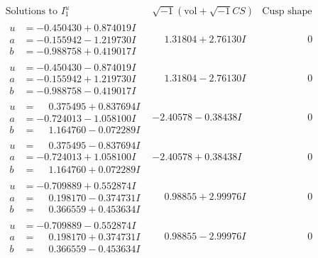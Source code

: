 \documentclass[1p]{elsarticle_modified}
\theoremstyle{definition}
\newcommand{\I}{\sqrt{-1}}
\begin{document}
$$\begin{array}{c|c|c}  
\text{Solutions to }I^u_{1}& \I (\text{vol} + \sqrt{-1}CS) & \text{Cusp shape}\\
 \hline 
\begin{aligned}
u &= -0.450430 + 0.874019 I \\
a &= -0.155942 - 1.219730 I \\
b &= -0.988758 + 0.419017 I\end{aligned}
 & \phantom{-}1.31804 + 2.76130 I & \phantom{-0.000000 } 0 \\ \hline\begin{aligned}
u &= -0.450430 - 0.874019 I \\
a &= -0.155942 + 1.219730 I \\
b &= -0.988758 - 0.419017 I\end{aligned}
 & \phantom{-}1.31804 - 2.76130 I & \phantom{-0.000000 } 0 \\ \hline\begin{aligned}
u &= \phantom{-}0.375495 + 0.837694 I \\
a &= -0.724013 - 1.058100 I \\
b &= \phantom{-}1.164760 - 0.072289 I\end{aligned}
 & -2.40578 - 0.38438 I & \phantom{-0.000000 } 0 \\ \hline\begin{aligned}
u &= \phantom{-}0.375495 - 0.837694 I \\
a &= -0.724013 + 1.058100 I \\
b &= \phantom{-}1.164760 + 0.072289 I\end{aligned}
 & -2.40578 + 0.38438 I & \phantom{-0.000000 } 0 \\ \hline\begin{aligned}
u &= -0.709889 + 0.552874 I \\
a &= \phantom{-}0.198170 - 0.374731 I \\
b &= \phantom{-}0.366559 + 0.453634 I\end{aligned}
 & \phantom{-}0.98855 + 2.99976 I & \phantom{-0.000000 } 0 \\ \hline\begin{aligned}
u &= -0.709889 - 0.552874 I \\
a &= \phantom{-}0.198170 + 0.374731 I \\
b &= \phantom{-}0.366559 - 0.453634 I\end{aligned}
 & \phantom{-}0.98855 - 2.99976 I & \phantom{-0.000000 } 0 \\ \hline\begin{aligned}

\end{aligned}
\end{array}$$
\end{document}
